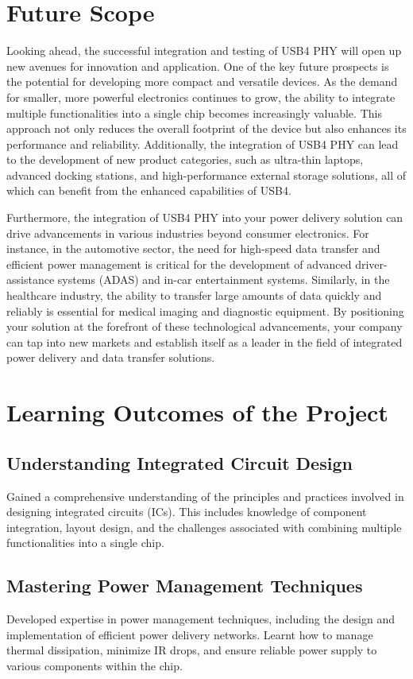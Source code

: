 \section{Future Scope}
Looking ahead, the successful integration and testing of USB4 PHY will open up new avenues for innovation and application. One of the key future prospects is the potential for developing more compact and versatile devices. As the demand for smaller, more powerful electronics continues to grow, the ability to integrate multiple functionalities into a single chip becomes increasingly valuable. This approach not only reduces the overall footprint of the device but also enhances its performance and reliability. Additionally, the integration of USB4 PHY can lead to the development of new product categories, such as ultra-thin laptops, advanced docking stations, and high-performance external storage solutions, all of which can benefit from the enhanced capabilities of USB4.

Furthermore, the integration of USB4 PHY into your power delivery solution can drive advancements in various industries beyond consumer electronics. For instance, in the automotive sector, the need for high-speed data transfer and efficient power management is critical for the development of advanced driver-assistance systems (ADAS) and in-car entertainment systems. Similarly, in the healthcare industry, the ability to transfer large amounts of data quickly and reliably is essential for medical imaging and diagnostic equipment. By positioning your solution at the forefront of these technological advancements, your company can tap into new markets and establish itself as a leader in the field of integrated power delivery and data transfer solutions.




\section{Learning Outcomes of the Project}
\subsection{Understanding Integrated Circuit Design}
Gained a comprehensive understanding of the principles and practices involved in designing integrated circuits (ICs). This includes knowledge of component integration, layout design, and the challenges associated with combining multiple functionalities into a single chip.

\subsection{Mastering Power Management Techniques}
Developed expertise in power management techniques, including the design and implementation of efficient power delivery networks. Learnt how to manage thermal dissipation, minimize IR drops, and ensure reliable power supply to various components within the chip.

